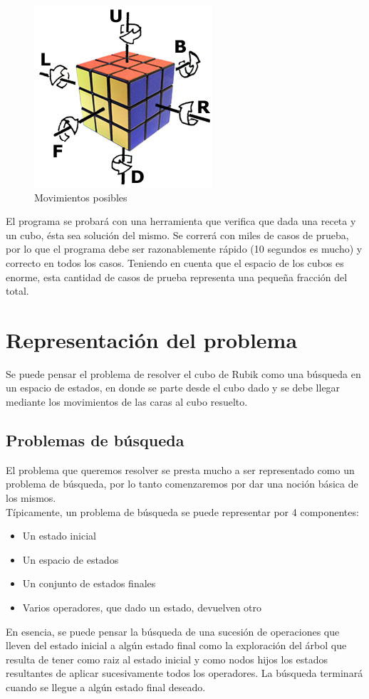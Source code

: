 \documentclass[11pt,a4paper]{article}
\begin{document}
\begin{figure}[H]
  \centering
    \includegraphics{img/giros}
  \caption{Movimientos posibles}
  \label{fig:ejemplo}
\end{figure}

El programa se probará con una herramienta que verifica que dada una receta y un cubo, ésta sea solución del mismo. Se correrá con miles de casos de prueba, por lo que el programa debe ser razonablemente rápido (10 segundos es mucho) y correcto en todos los casos. Teniendo en cuenta que el espacio de los cubos es enorme, esta cantidad de casos de prueba representa una pequeña fracción del total.


\section{Representación del problema}

Se puede pensar el problema de resolver el cubo de Rubik como una búsqueda en un espacio de estados, en donde se parte desde el cubo dado y se debe llegar mediante los movimientos de las caras al cubo resuelto. 


\subsection{Problemas de búsqueda}
El problema que queremos resolver se presta mucho a ser representado como un problema de búsqueda, por lo tanto comenzaremos por dar una noción básica de los mismos. \\
Típicamente, un problema de búsqueda se puede representar por 4 componentes:
\begin{itemize}
\item Un estado inicial
\item Un espacio de estados
\item Un conjunto de estados finales 
\item Varios operadores, que dado un estado, devuelven otro
\end{itemize}
En esencia, se puede pensar la búsqueda de una sucesión de operaciones que lleven del estado inicial a algún estado final como la exploración del árbol que resulta de tener como raiz al estado inicial y como nodos hijos los estados resultantes de aplicar sucesivamente todos los operadores. La búsqueda terminará cuando se llegue a algún estado final deseado.\\
\end{document}
